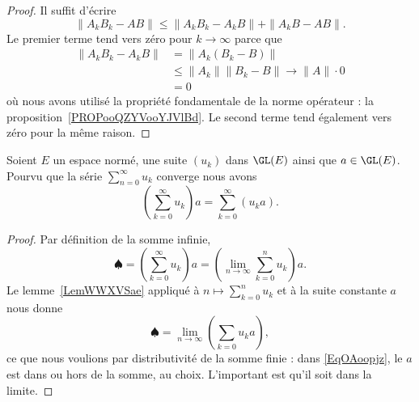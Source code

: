 \begin{proof}
    Il suffit d'écrire
    \begin{equation}
        \| A_kB_k-AB \|\leq \| A_kB_k-A_kB \|+\| A_kB-AB \|.
    \end{equation}
    Le premier terme tend vers zéro pour \( k\to\infty\) parce que
    \begin{subequations}
        \begin{align}
            \| A_kB_k-A_kB \|&=\| A_k(B_k-B) \|\\
            &\leq \| A_k \|\| B_k-B \|\to \| A \|\cdot 0\\
            &=0
        \end{align}
    \end{subequations}
    où nous avons utilisé la propriété fondamentale de la norme opérateur : la proposition~\ref{PROPooQZYVooYJVlBd}. Le second terme tend également vers zéro pour la même raison.
\end{proof}

\begin{proposition} \label{PropQXqEPuG}
    Soient \( E\) un espace normé, une suite \( (u_k)\) dans \( \GL(E)\) ainsi que \( a\in\GL(E)\). Pourvu que la série \( \sum_{n=0}^{\infty}u_k\) converge nous avons
    \begin{equation}
        \left( \sum_{k=0}^{\infty}u_k \right)a=\sum_{k=0}^{\infty}(u_ka).
    \end{equation}
\end{proposition}

\begin{proof}
    Par définition de la somme infinie,
    \begin{equation}
        \spadesuit=\left( \sum_{k=0}^{\infty}u_k \right)a=\left( \lim_{n\to \infty} \sum_{k=0}^nu_k \right)a.
    \end{equation}
    Le lemme~\ref{LemWWXVSae} appliqué à \( n\mapsto\sum_{k=0}^nu_k\) et à la suite constante \( a\) nous donne
    \begin{equation}    \label{EqOAoopjz}
        \spadesuit=\lim_{n\to \infty} \left( \sum_{k=0}u_ka \right),
    \end{equation}
    ce que nous voulions par distributivité de la somme finie : dans \eqref{EqOAoopjz}, le \( a\) est dans ou hors de la somme, au choix. L'important est qu'il soit dans la limite.
\end{proof}

